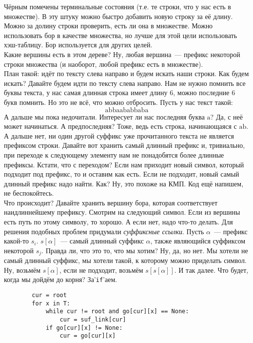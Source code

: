 \documentclass{article}
\begin{document}
    Чёрным помечены терминальные состояния (т.е. те строки, что у нас есть в множестве). В эту штуку можно быстро добавить новую строку за её длину. Можно за долину строки проверить, есть ли она в множестве. Можно использовать бор в качестве множества, но лучше для этой цели использовать хэш-таблицу. Бор используется для других целей.\\
    Какие вершины есть в этом дереве? Ну, любая вершина~--- префикс некоторой строки множества (и наоборот, любой префикс есть в множестве).\\
    План такой: идёт по тексту слева направо и будем искать наши строки. Как будем искать? Давайте будем идти по тексту слева направо. Нам не нужно помнить все буквы текста, у нас самая длинная строка имеет длину 6, можно последние 6 букв помнить. Но это не всё, что можно отбросить. Пусть у нас текст такой:
    $$
    \mathrm{abbaababbaba}
    $$
    А дальше мы пока недочитали. Интересует ли нас последняя буква $\mathrm{a}$? Да, с неё может начинаться. А предпоследняя? Тоже, ведь есть строка, начинающаяся с $\mathrm{ab}$. А дальше нет, ни один другой суффикс уже прочитанного текста не является префиксом строки. Давайте вот хранить самый длинный префикс и, тривиально, при переходе к следующему элементу нам не понадобятся более длинные префиксы. Кстати, что с переходом? Если нам приходит новый символ, который подходит под префикс, то и оставим как есть. Если не подходит, новый самый длинный префикс надо найти. Как? Ну, это похоже на КМП. Код ещё напишем, не беспокойтесь.\\
    Что происходит? Давайте хранить вершину бора, которая соответствует наидлиннейшему префиксу. Смотрим на следующий символ. Если из вершины есть путь по этому символу, то хорошо. А если нет, надо что-то делать. Для решения подобных проблем придумали \textit{суффиксные ссылки}. Пусть $\alpha$~--- префикс какой-то $s_i$. $s[\alpha]$~--- самый длинный суффикс $\alpha$, также являющийся суффиксом некоторой $s_j$. Правда ли, что это то, что мы хотим? Ну, да, но нет. Мы хотели не самый длинный суффикс, мы хотели такой, к которому можно приделать символ. Ну, возьмём $s[\alpha]$, если не подходит, возьмём $s[s[\alpha]]$. И так далее. Что будет, когда мы дойдём до корня? За'\texttt{if}'аем.
    \begin{verbatim}
        cur = root
        for x in T:
            while cur != root and go[cur][x] == None:
                cur = suf_link[cur]
            if go[cur][x] != None:
                cur = go[cur][x]
    \end{verbatim}
\end{document}
